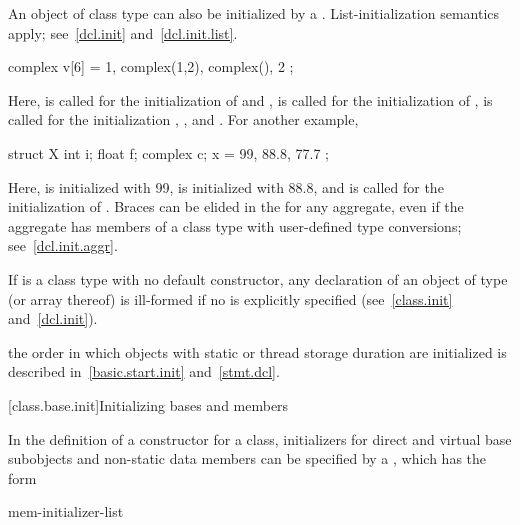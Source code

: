 \pnum
{}%
%
An object of class type can also be initialized by a
. List-initialization semantics apply;
see~\ref{dcl.init} and~\ref{dcl.init.list}. \enterexample

\begin{codeblock}
complex v[6] = { 1, complex(1,2), complex(), 2 };
\end{codeblock}

Here,
is called for the initialization of
and
,
is called for the initialization of
,
is called for the initialization
,
,
and
.
For another example,

\begin{codeblock}
struct X {
  int i;
  float f;
  complex c;
} x = { 99, 88.8, 77.7 };
\end{codeblock}

Here,
is initialized with 99,
is initialized with 88.8, and
is called for the initialization of
.
\exitexample
\enternote
Braces can be elided in the
for any aggregate, even if the aggregate has members of a class type with
user-defined type conversions; see~\ref{dcl.init.aggr}.
\exitnote

\pnum
\enternote
If
is a class type with no default constructor,
any declaration of an object of type
(or array thereof) is ill-formed if no
is explicitly specified (see~\ref{class.init} and~\ref{dcl.init}).
\exitnote

\pnum
\enternote
{}%
the order in which objects with static or thread storage duration
are initialized is described in~\ref{basic.start.init} and~\ref{stmt.dcl}.
\exitnote

[class.base.init]{Initializing bases and members}%
%

\pnum
In the definition of a constructor for a class,
initializers for direct and virtual base subobjects and
non-static data members can be specified by a
,
which has the form

\begin{bnf}
\br
    \terminal{:} mem-initializer-list
\end{bnf}


